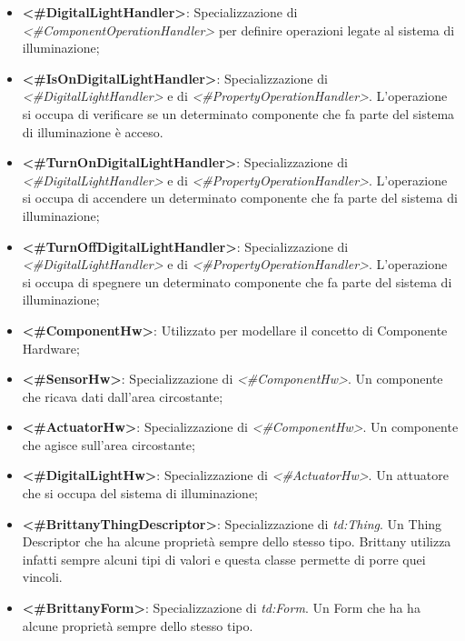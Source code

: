 \begin{itemize}
	\item \textbf{<\#DigitalLightHandler>}: Specializzazione di \textit{<\#ComponentOperationHandler>} per definire operazioni legate al sistema di illuminazione;

	\item \textbf{<\#IsOnDigitalLightHandler>}: Specializzazione di \textit{<\#DigitalLightHandler>} e di \textit{<\#PropertyOperationHandler>}. L'operazione si occupa di verificare se un determinato componente che fa parte del sistema di illuminazione è acceso.

	\item \textbf{<\#TurnOnDigitalLightHandler>}: Specializzazione di \textit{<\#DigitalLightHandler>} e di \textit{<\#PropertyOperationHandler>}. L'operazione si occupa di accendere un determinato componente che fa parte del sistema di illuminazione;

	\item \textbf{<\#TurnOffDigitalLightHandler>}: Specializzazione di \textit{<\#DigitalLightHandler>} e di \textit{<\#PropertyOperationHandler>}. L'operazione si occupa di spegnere un determinato componente che fa parte del sistema di illuminazione;

	\item \textbf{<\#ComponentHw>}: Utilizzato per modellare il concetto di Componente Hardware;

	\item \textbf{<\#SensorHw>}: Specializzazione di \textit{<\#ComponentHw>}. Un componente che ricava dati dall'area circostante;

	\item \textbf{<\#ActuatorHw>}: Specializzazione di \textit{<\#ComponentHw>}. Un componente che agisce sull'area circostante;

	\item \textbf{<\#DigitalLightHw>}: Specializzazione di \textit{<\#ActuatorHw>}. Un attuatore che si occupa del sistema di illuminazione;

	\item \textbf{<\#BrittanyThingDescriptor>}: Specializzazione di \textit{td:Thing}. Un Thing Descriptor che ha alcune proprietà sempre dello stesso tipo. Brittany utilizza infatti sempre alcuni tipi di valori e questa classe permette di porre quei vincoli.

	\item \textbf{<\#BrittanyForm>}: Specializzazione di \textit{td:Form}. Un Form che ha ha alcune proprietà sempre dello stesso tipo.

\end{itemize}

